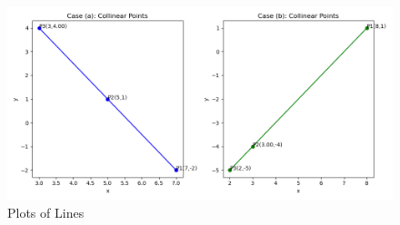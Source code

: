 \documentclass[journal]{IEEEtran}
\begin{document}
\begin{figure}[h!]
   \centering
   \includegraphics[width=0.7\linewidth]{figs/Figure_1.png}
   \caption{Plots of Lines}
   \label{plot}
\end{figure}
\end{document}
